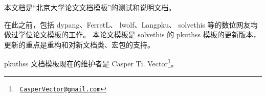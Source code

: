 
本文档是“北京大学论文文档模板”的测试和说明文档。

在此之前，包括 dypang\cite{dypang}、FerretL\cite{FerretL}、%
lwolf\cite{lwolf}、Langpku\cite{Langpku}、%
solvethis\cite{solvethis} 等的数位网友均做过学位论文模板的工作。
本论文模板是 solvethis 的 pkuthss 模板的更新版本，
更新的重点是重构和对新文档类、宏包的支持。

pkuthss 文档模板现在的维护者是 Casper Ti. Vector\footnote%
{\ \href{CasperVector@gmail.com}{\texttt{CasperVector@gmail.com}}}。

